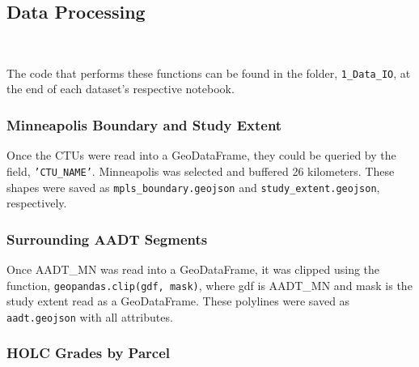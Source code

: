 \documentclass[article,12pt]{article}
\numberwithin{equation}{section}
\begin{document}
\subsection{Data Processing}
\begin{adjustwidth}{-.88in}{-.88in}
	\begin{center}
		\\
		
	\end{center}
\end{adjustwidth}
\vspace{.5in}

The code that performs these functions can be found in the folder, \texttt{1\_Data\_IO}, at the end of each dataset's respective notebook.

\subsubsection{Minneapolis Boundary and Study Extent}

Once the CTUs were read into a GeoDataFrame, they could be queried by the field, \texttt{'CTU\_NAME'}. Minneapolis was selected and buffered 26 kilometers. These shapes were saved as \newline \texttt{mpls\_boundary.geojson} and \texttt{study\_extent.geojson}, respectively. 

\subsubsection{Surrounding AADT Segments}

Once AADT\_MN was read into a GeoDataFrame, it was clipped using the function, \newline \texttt{geopandas.clip(gdf, mask)}, where gdf is AADT\_MN and mask is the study extent read as a GeoDataFrame. These polylines were saved as \texttt{aadt.geojson} with all attributes.

\subsubsection{HOLC Grades by Parcel}
\end{document}
